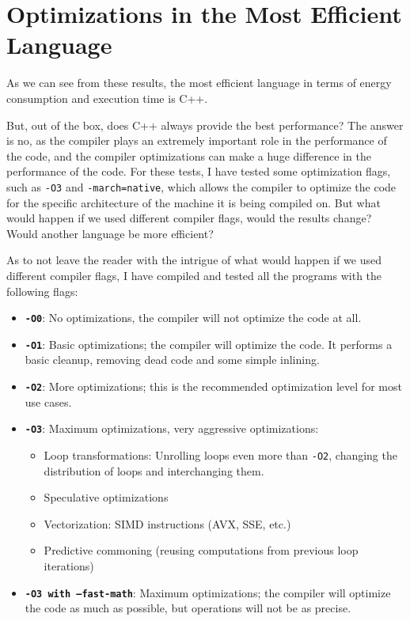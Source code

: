 \section{Optimizations in the Most Efficient Language}
As we can see from these results, the most efficient language in terms of energy consumption and execution time is C++. 

But, out of the box, does C++ always provide the best performance? The answer is no, as the compiler plays an extremely important role in the performance of the code, and the compiler optimizations can make a huge difference in the performance of the code.
For these tests, I have tested some optimization flags, such as \texttt{-O3} and \texttt{-march=native}, which allows the compiler to optimize the code for the specific architecture of the machine it is being compiled on. But what would happen if we used different compiler flags, would the results change? Would another language be more efficient?

As to not leave the reader with the intrigue of what would happen if we used different compiler flags, I have compiled and tested all the programs with the following flags:
\begin{itemize}
    \item \textbf{\texttt{-O0}}: No optimizations, the compiler will not optimize the code at all.
    \item \textbf{\texttt{-O1}}: Basic optimizations; the compiler will optimize the code. It performs a basic cleanup, removing dead code and some simple inlining.
    \item \textbf{\texttt{-O2}}: More optimizations; this is the recommended optimization level for most use cases.
    \item \textbf{\texttt{-O3}}: Maximum optimizations, very aggressive optimizations:
    \begin{itemize}
        \item Loop transformations: Unrolling loops even more than \texttt{-O2}, changing the distribution of loops and interchanging them.
        \item Speculative optimizations
        \item Vectorization: \gls{SIMD} instructions (AVX, SSE, etc.)
        \item Predictive commoning (reusing computations from previous loop iterations)
    \end{itemize}
    \item \textbf{\texttt{-O3 with --fast-math}}: Maximum optimizations; the compiler will optimize the code as much as possible, but operations will not be as precise.
\end{itemize}

